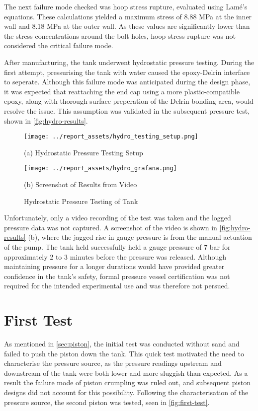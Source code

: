 The next failure mode checked was hoop stress rupture, evaluated using Lamé's equations. These calculations yielded a maximum stress of 8.88 MPa at the inner wall and 8.18 MPa at the outer wall. As these values are significantly lower than the stress concentrations around the bolt holes, hoop stress rupture was not considered the critical failure mode.

After manufacturing, the tank underwent hydrostatic pressure testing. During the first attempt, pressurising the tank with water caused the epoxy-Delrin interface to seperate. Although this failure mode was anticipated during the design phase, it was expected that reattaching the end cap using a more plastic-compatible epoxy, along with thorough surface preperation of the Delrin bonding area, would resolve the issue. This assumption was validated in the subsequent pressure test, shown in \autoref{fig:hydro-results}.
\begin{figure}[htbp]
    \centering

    \begin{minipage}{0.45\textwidth}
        \centering
        \texttt{[image: ../report\_assets/hydro\_testing\_setup.png]}
        \caption*{(a) Hydrostatic Pressure Testing Setup}
    \end{minipage}    
    \hfill
    \begin{minipage}{0.45\textwidth}
        \centering
        \texttt{[image: ../report\_assets/hydro\_grafana.png]}
        \caption*{(b) Screenshot of Results from Video}
    \end{minipage}    
    \caption{Hydrostatic Pressure Testing of Tank}\label{fig:hydro-results}

\end{figure}  
Unfortunately, only a video recording of the test was taken and the logged pressure data was not captured. A screenshot of the video is shown in \autoref{fig:hydro-results} (b), where the jagged rise in gauge pressure is from the manual actuation of the pump. The tank held successfully held a gauge pressure of 7 bar for approximately 2 to 3 minutes before the pressure was released. Although maintaining pressure for a longer durations would have provided greater confidence in the tank's safety, formal pressure vessel certification was not required for the intended experimental use and was therefore not persued.

\section{First Test}\label{sec:first-test}
As mentioned in \autoref{sec:piston}, the initial test was conducted without sand and failed to push the piston down the tank. This quick test motivated the need to characterise the pressure source, as the pressure readings upstream and downstream of the tank were both lower and more sluggish than expected. As a result the failure mode of piston crumpling was ruled out, and subsequent piston designs did not account for this possibility. Following the characterisation of the pressure source, the second piston was tested, seen in \autoref{fig:first-test}. 

